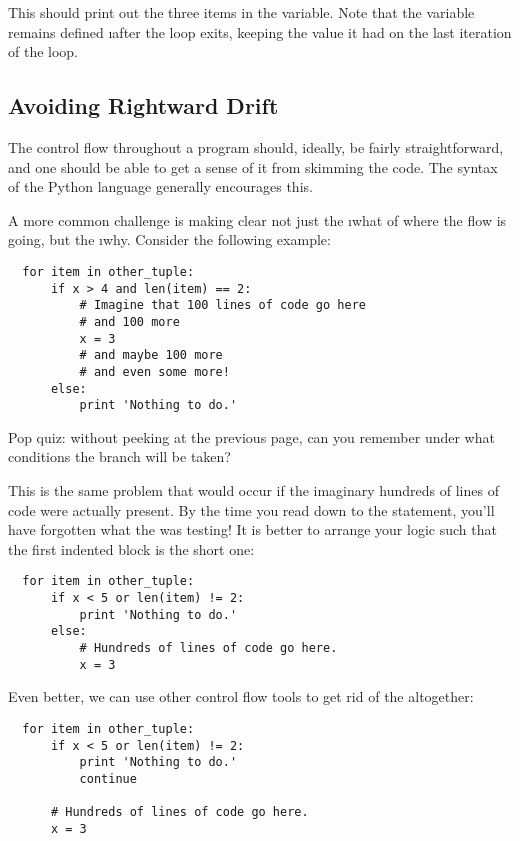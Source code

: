 \documentclass[letterpaper, 12pt, titlepage, twoside]{article}
\begin{document}
This should print out the three items in the  variable. Note
that the variable  remains defined \i{after} the  loop exits,
keeping the value it had on the last iteration of the loop.

\subsection*{Avoiding Rightward Drift}

The control flow throughout a program should, ideally, be fairly
straightforward, and one should be able to get a sense of it from skimming the
code. The syntax of the Python language generally encourages this.

A more common challenge is making clear not just the \i{what} of where the
flow is going, but the \i{why}. Consider the following example:


\begin{lstlisting}
  for item in other_tuple:
      if x > 4 and len(item) == 2:
          # Imagine that 100 lines of code go here
          # and 100 more
          x = 3
          # and maybe 100 more
          # and even some more!
      else:
          print 'Nothing to do.'
\end{lstlisting}

Pop quiz: without peeking at the previous page, can you remember under what
conditions the  branch will be taken?

This is the same problem that would occur if the imaginary hundreds of lines
of code were actually present. By the time you read down to the 
statement, you'll have forgotten what the  was testing! It is better to
arrange your logic such that the first indented block is the short one:

\begin{lstlisting}
  for item in other_tuple:
      if x < 5 or len(item) != 2:
          print 'Nothing to do.'
      else:
          # Hundreds of lines of code go here.
          x = 3
\end{lstlisting}

Even better, we can use other control flow tools to get rid of the 
altogether:

\begin{lstlisting}
  for item in other_tuple:
      if x < 5 or len(item) != 2:
          print 'Nothing to do.'
          continue

      # Hundreds of lines of code go here.
      x = 3
\end{lstlisting}
\end{document}
